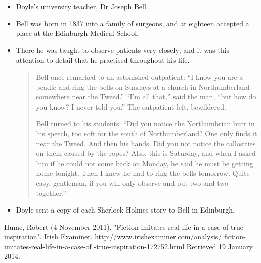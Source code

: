 \documentclass[a4paper,landscape,headrule,footrule,xetex,25pt]{foils}
\begin{document}
\begin{itemize}
\item  Doyle's university teacher, Dr Joseph Bell
\item Bell was born in 1837 into a family of surgeons, and at eighteen accepted a place at the Edinburgh Medical School.
\item There he was taught to observe patients very closely; and it was this attention to detail that he practised throughout his life.
  \begin{quotation}
    
Bell once remarked to an astonished outpatient: “I know you are a beadle and ring the bells on Sundays at a church in Northumberland somewhere near the Tweed.” “I'm all that,” said the man, “but how do you know? I never told you.” The outpatient left, bewildered.

Bell turned to his students: “Did you notice the Northumbrian burr in his speech, too soft for the south of Northumberland? One only finds it near the Tweed. And then his hands. Did you not notice the callosities on them caused by the ropes? Also, this is Saturday, and when I asked him if he could not come back on Monday, he said he must be getting home tonight. Then I knew he had to ring the bells tomorrow. Quite easy, gentleman, if you will only observe and put two and two together.” 
\end{quotation}
\item Doyle sent a copy of each Sherlock Holmes story to Bell in Edinburgh.
\end{itemize}

Hume, Robert (4 November 2011). "Fiction imitates real life in a case of true inspiration". Irish Examiner. 
\url{http://www.irishexaminer.com/analysis/}
\url{fiction-imitates-real-life-in-a-case-of}
\url{-true-inspiration-172752.html} 
Retrieved 19 January 2014.

\end{document}
